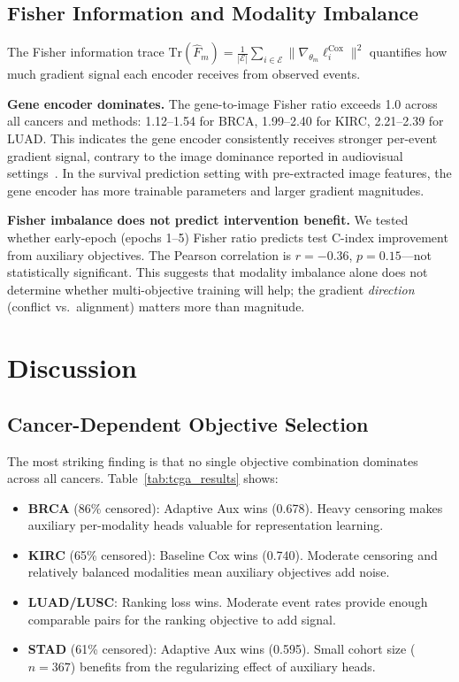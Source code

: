 \documentclass[10pt,twocolumn]{article}
\begin{document}
\subsection{Fisher Information and Modality Imbalance}

The Fisher information trace
$\text{Tr}(\hat{F}_m) = \frac{1}{|\mathcal{E}|} \sum_{i \in \mathcal{E}}
\|\nabla_{\theta_m} \ell_i^{\text{Cox}}\|^2$
quantifies how much gradient signal each encoder receives from
observed events.

\textbf{Gene encoder dominates.} The gene-to-image Fisher ratio
exceeds 1.0 across all cancers and methods: 1.12--1.54 for BRCA,
1.99--2.40 for KIRC, 2.21--2.39 for LUAD. This indicates the gene
encoder consistently receives stronger per-event gradient signal,
contrary to the image dominance reported in audiovisual
settings~\cite{peng2022ogm}. In the survival prediction setting with
pre-extracted image features, the gene encoder has more trainable
parameters and larger gradient magnitudes.

\textbf{Fisher imbalance does not predict intervention benefit.}
We tested whether early-epoch (epochs 1--5) Fisher ratio predicts
test C-index improvement from auxiliary objectives. The Pearson
correlation is $r = -0.36$, $p = 0.15$---not statistically
significant. This suggests that modality imbalance alone does not
determine whether multi-objective training will help; the gradient
\textit{direction} (conflict vs.\ alignment) matters more than
magnitude.


\section{Discussion}

\subsection{Cancer-Dependent Objective Selection}

The most striking finding is that no single objective combination
dominates across all cancers. Table~\ref{tab:tcga_results} shows:
\begin{itemize}
\item \textbf{BRCA} (86\% censored): Adaptive Aux wins (0.678).
Heavy censoring makes auxiliary per-modality heads valuable for
representation learning.
\item \textbf{KIRC} (65\% censored): Baseline Cox wins (0.740).
Moderate censoring and relatively balanced modalities mean auxiliary
objectives add noise.
\item \textbf{LUAD/LUSC}: Ranking loss wins. Moderate event rates
provide enough comparable pairs for the ranking objective to add signal.
\item \textbf{STAD} (61\% censored): Adaptive Aux wins (0.595).
Small cohort size ($n\!=\!367$) benefits from the regularizing
effect of auxiliary heads.
\end{itemize}
\end{document}
